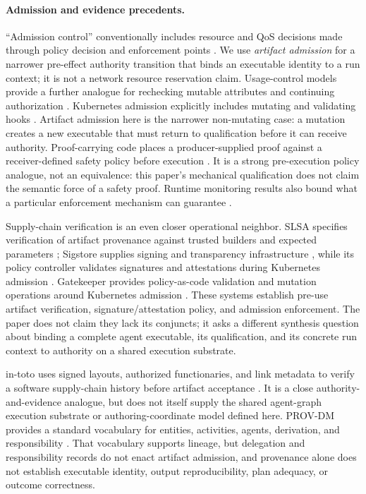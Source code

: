 \documentclass[11pt]{article}
\begin{document}
\paragraph{Admission and evidence precedents.}
``Admission control'' conventionally includes resource and QoS decisions made
through policy decision and enforcement points \cite{IETF2000RFC2753}.  We use
\emph{artifact admission} for a narrower pre-effect authority transition that
binds an executable identity to a run context; it is not a network resource
reservation claim.  Usage-control models provide a further analogue for
rechecking mutable attributes and continuing authorization
\cite{Park2004UCON}.
Kubernetes admission explicitly includes mutating and validating hooks
\cite{Kubernetes2026Admission}. Artifact admission here is the narrower
non-mutating case: a mutation creates a new executable that must return to
qualification before it can receive authority.
Proof-carrying code places a producer-supplied proof against a receiver-defined
safety policy before execution \cite{Necula1997PCC}.  It is a strong
pre-execution policy analogue, not an equivalence: this paper's mechanical
qualification does not claim the semantic force of a safety proof.  Runtime
monitoring results also bound what a particular enforcement mechanism can
guarantee \cite{Schneider2000EnforceablePolicies}.

Supply-chain verification is an even closer operational neighbor. SLSA
specifies verification of artifact provenance against trusted builders and
expected parameters \cite{SLSA2026Verification}; Sigstore supplies signing
and transparency infrastructure \cite{Newman2022Sigstore}, while its policy
controller validates signatures and attestations during Kubernetes admission
\cite{Sigstore2026PolicyController}. Gatekeeper provides policy-as-code
validation and mutation operations around Kubernetes admission
\cite{OPA2026GatekeeperOperations}. These systems establish pre-use artifact
verification, signature/attestation policy, and admission enforcement. The
paper does not claim they lack its conjuncts; it asks a different synthesis
question about binding a complete agent executable, its qualification, and
its concrete run context to authority on a shared execution substrate.

in-toto uses signed layouts, authorized functionaries, and link metadata to
verify a software supply-chain history before artifact acceptance
\cite{Torres2019inToto}.  It is a close authority-and-evidence analogue, but
does not itself supply the shared agent-graph execution substrate or
authoring-coordinate model defined here.  PROV-DM
provides a standard vocabulary for entities, activities, agents, derivation,
and responsibility \cite{W3C2013PROVDM}.  That vocabulary supports lineage,
but delegation and responsibility records do not enact artifact admission, and
provenance alone does not establish executable identity, output reproducibility,
plan adequacy, or outcome correctness.
\end{document}
